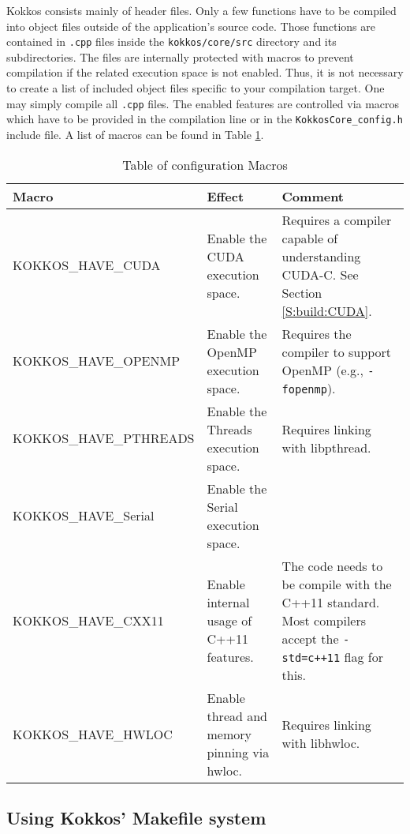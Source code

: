 Kokkos consists mainly of header files. 
Only a few functions have to be compiled into object files outside of the application's source code.
Those functions are contained in \verb!.cpp! files inside the \lstinline|kokkos/core/src| directory and its subdirectories.
The files are internally protected with macros to prevent compilation if the related execution space is not enabled. 
Thus, it is not necessary to create a list of included object files specific to your compilation target.
One may simply compile all \verb!.cpp! files. 
The enabled features are controlled via macros which have to be provided in the compilation line or in the \lstinline|KokkosCore_config.h| include file. 
A list of macros can be found in Table \ref{TBL:CompileMacros}.
\begin{table}
\caption{Table of configuration Macros}
\label{TBL:CompileMacros}
\begin{small}
\begin{tabular}[t]{p{}p{}p{}}
\hline\hline
Macro & Effect & Comment \\
\hline
{\tiny KOKKOS\_HAVE\_CUDA} & Enable the CUDA execution space. & Requires a compiler capable of understanding CUDA-C. See Section \ref{S:build:CUDA}. \\
{\tiny KOKKOS\_HAVE\_OPENMP} & Enable the OpenMP execution space. & Requires the compiler to support OpenMP (e.g., \verb!-fopenmp!). \\
{\tiny KOKKOS\_HAVE\_PTHREADS} & Enable the Threads execution space. & Requires linking with libpthread.\\
{\tiny KOKKOS\_HAVE\_Serial} & Enable the Serial execution space. & \\
{\tiny KOKKOS\_HAVE\_CXX11} & Enable internal usage of C++11 features. & The code needs to be compile with the C++11 standard. Most compilers accept the \verb!-std=c++11! flag for this.\\
{\tiny KOKKOS\_HAVE\_HWLOC} & Enable thread and memory pinning via hwloc. & Requires linking with libhwloc.\\
\hline\hline
\end{tabular}
\end{small}
\end{table}

\subsection{Using Kokkos' Makefile system}\label{S:build:make}

